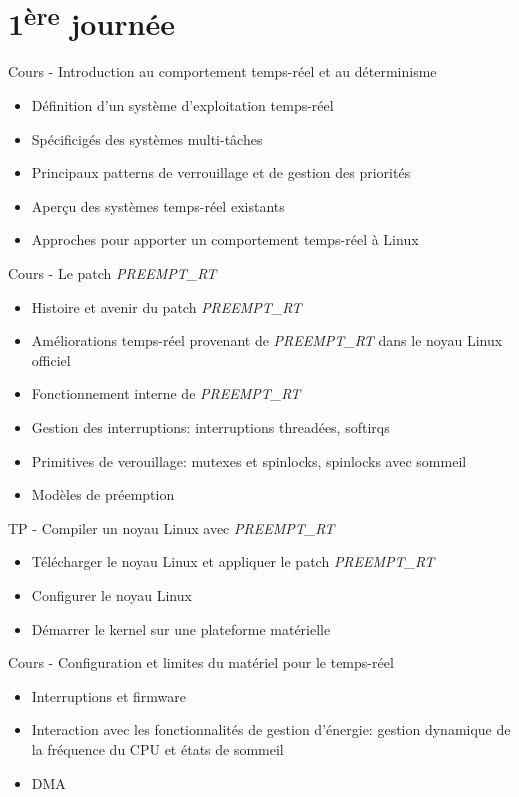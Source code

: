 \documentclass[a4paper,12pt,obeyspaces,spaces,hyphens]{article}
\begin{document}
\section{1\textsuperscript{ère} journée}

\feagendaonecolumn
{Cours - Introduction au comportement temps-réel et au déterminisme}
{
  \begin{itemize}
  \item Définition d'un système d'exploitation temps-réel
  \item Spécificigés des systèmes multi-tâches
  \item Principaux patterns de verrouillage et de gestion des priorités
  \item Aperçu des systèmes temps-réel existants
  \item Approches pour apporter un comportement temps-réel à Linux
  \end{itemize}
}

\feagendatwocolumn
{Cours - Le patch {\em PREEMPT\_RT}}
{
  \begin{itemize}
  \item Histoire et avenir du patch {\em PREEMPT\_RT}
  \item Améliorations temps-réel provenant de {\em PREEMPT\_RT} dans le noyau Linux officiel
  \item Fonctionnement interne de {\em PREEMPT\_RT}
  \item Gestion des interruptions: interruptions threadées, softirqs
  \item Primitives de verouillage: mutexes et spinlocks, spinlocks avec sommeil
  \item Modèles de préemption
  \end{itemize}
}
{TP - Compiler un noyau Linux avec {\em PREEMPT\_RT}}
{
  \begin{itemize}
  \item Télécharger le noyau Linux et appliquer le patch {\em PREEMPT\_RT}
  \item Configurer le noyau Linux
  \item Démarrer le kernel sur une plateforme matérielle
 \end{itemize}
}

\feagendaonecolumn
{Cours - Configuration et limites du matériel pour le temps-réel}
{
  \begin{itemize}
  \item Interruptions et firmware
  \item Interaction avec les fonctionnalités de gestion d'énergie:
    gestion dynamique de la fréquence du CPU et états de sommeil
  \item DMA
  \end{itemize}
}
\end{document}
